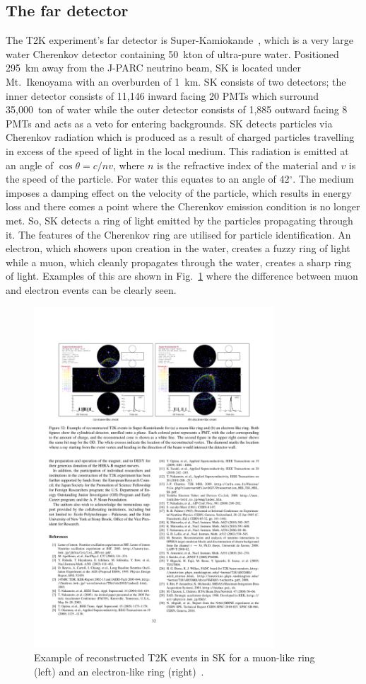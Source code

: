 \subsection{The far detector}
The T2K experiment's far detector is Super-Kamiokande~\cite{Fukuda2003418}, which is a very large water Cherenkov detector containing 50~kton of ultra-pure water.  Positioned 295~km away from the J-PARC neutrino beam, SK is located under Mt.~Ikenoyama with an overburden of 1~km.  SK consists of two detectors; the inner detector consists of 11,146 inward facing 20 PMTs which surround 35,000~ton of water while the outer detector consists of 1,885 outward facing 8 PMTs and acts as a veto for entering backgrounds.
\newline
\newline
SK detects particles via Cherenkov radiation which is produced as a result of charged particles travelling in excess of the speed of light in the local medium.  This radiation is emitted at an angle of $\cos \theta = c/nv$, where $n$ is the refractive index of the material and $v$ is the speed of the particle.  For water this equates to an angle of 42$^\circ$.  The medium imposes a damping effect on the velocity of the particle, which results in energy loss and there comes a point where the Cherenkov emission condition is no longer met.  So, SK detects a ring of light emitted by the particles propagating through it.
\newline
\newline
The features of the Cherenkov ring are utilised for particle identification.  An electron, which showers upon creation in the water, creates a fuzzy ring of light while a muon, which cleanly propagates through the water, creates a sharp ring of light.  Examples of this are shown in Fig.~\ref{fig:SKPID} where the difference between muon and electron events can be clearly seen.
\begin{figure}
  \centering
  \includegraphics[width=9cm]{images/t2k/SK_PID.pdf}
  \caption{Example of reconstructed T2K events in SK for a muon-like ring (left) and an electron-like ring (right)~\cite{Abe2011106}.}
  \label{fig:SKPID}
\end{figure}




